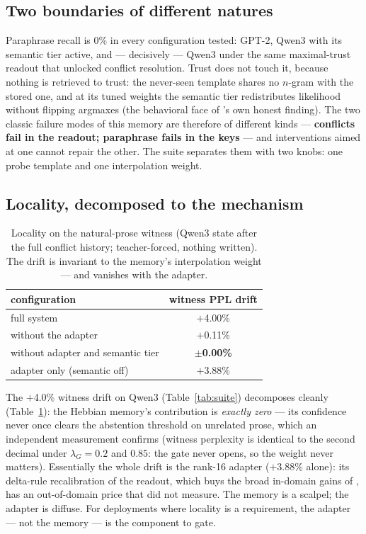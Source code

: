 \documentclass[11pt]{article}
\begin{document}
\subsection{Two boundaries of different natures}\label{sec:boundaries}

Paraphrase recall is 0\% in every configuration tested: GPT-2, Qwen3 with its semantic tier active, and --- decisively --- Qwen3 under the same maximal-trust readout that unlocked conflict resolution. Trust does not touch it, because nothing is retrieved to trust: the never-seen template shares no $n$-gram with the stored one, and at its tuned weights the semantic tier redistributes likelihood without flipping argmaxes (the behavioral face of \cite{router}'s own honest finding). The two classic failure modes of this memory are therefore of different kinds --- \textbf{conflicts fail in the readout; paraphrase fails in the keys} --- and interventions aimed at one cannot repair the other. The suite separates them with two knobs: one probe template and one interpolation weight.

\subsection{Locality, decomposed to the mechanism}\label{sec:locality}

\begin{table}[t]
\centering\small
\caption{Locality on the natural-prose witness (Qwen3 state after the full conflict history; teacher-forced, nothing written). The drift is invariant to the memory's interpolation weight --- and vanishes with the adapter.}
\label{tab:locality}
\begin{tabular}{@{}lc@{}}
\toprule
configuration & witness PPL drift\\
\midrule
full system & $+$4.00\%\\
without the adapter & $+$0.11\%\\
without adapter and semantic tier & $\pm$\textbf{0.00\%}\\
adapter only (semantic off) & $+$3.88\%\\
\bottomrule
\end{tabular}
\end{table}

The $+$4.0\% witness drift on Qwen3 (Table~\ref{tab:suite}) decomposes cleanly (Table~\ref{tab:locality}): the Hebbian memory's contribution is \emph{exactly zero} --- its confidence never once clears the abstention threshold on unrelated prose, which an independent measurement confirms (witness perplexity is identical to the second decimal under $\lambda_G = 0.2$ and $0.85$: the gate never opens, so the weight never matters). Essentially the whole drift is the rank-16 adapter ($+$3.88\% alone): its delta-rule recalibration of the readout, which buys the broad in-domain gains of \cite{fw}, has an out-of-domain price that \cite{fw} did not measure. The memory is a scalpel; the adapter is diffuse. For deployments where locality is a requirement, the adapter --- not the memory --- is the component to gate.
\end{document}
